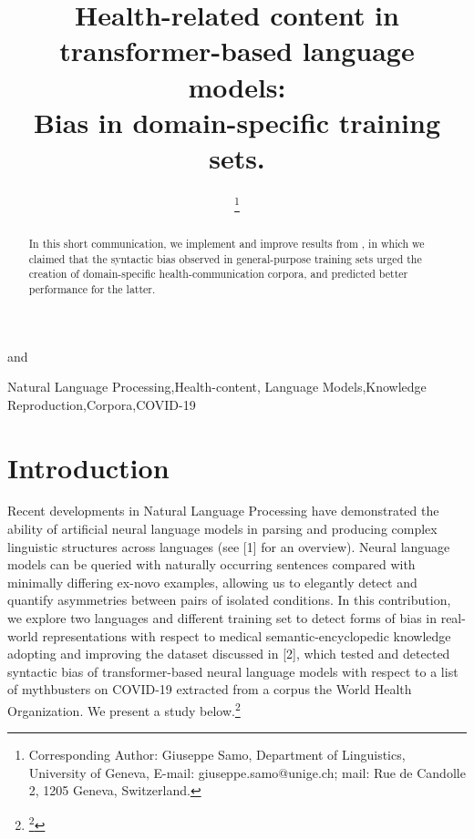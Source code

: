 \documentclass{IOS-Book-Article}
\def\hb{\hbox to 11.5 cm{}}
\begin{document}
\pagestyle{headings}
\def\thepage{}
\begin{frontmatter}              %


\title{Health-related content in transformer-based language models:\\ Bias in domain-specific training sets.}

\markboth{}{January 2023\hb}


\author[A]{ %
}
and
\author[B]{ 
\thanks{Corresponding Author: Giuseppe Samo, Department of Linguistics, University of Geneva, E-mail: giuseppe.samo@unige.ch; mail: Rue de Candolle 2, 1205 Geneva, Switzerland. }}
\address[A]{University of Cambridge}
\address[B]{University of Geneva}

\begin{abstract}
In this short communication, we implement and improve results from \cite{r1}, in which we claimed that the syntactic bias observed in general-purpose training sets urged the creation of domain-specific health-communication corpora, and predicted better performance for the latter. 
\end{abstract}

\begin{keyword}
Natural Language Processing\sep Health-content\sep 
Language Models\sep Knowledge Reproduction\sep Corpora\sep COVID-19
\end{keyword}
\end{frontmatter}
\markboth{January 2023\hb}{January 2023\hb}

\section{Introduction}

Recent developments in Natural Language Processing have
demonstrated the ability of artificial neural language models in parsing and producing complex linguistic structures across languages (see [1] for an overview). Neural language models can be queried with naturally occurring sentences compared with minimally differing ex-novo examples, allowing us to elegantly detect and quantify asymmetries between pairs of isolated conditions.
In this contribution, we explore two languages and different training set to detect forms of bias in real-world representations with respect to medical semantic-encyclopedic knowledge adopting and improving the dataset discussed in [2], which tested and detected syntactic bias of transformer-based neural language models with respect to a list of mythbusters on COVID-19 extracted from a corpus the World Health Organization. We present a study below.\footnote{\footnote{Additional information with respect to the data are all available at the following link:}}
\end{document}
